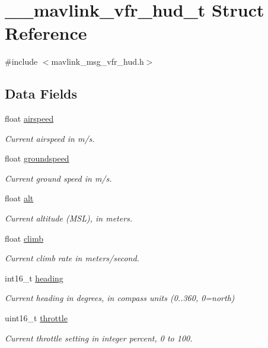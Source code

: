 \hypertarget{struct____mavlink__vfr__hud__t}{\section{\+\_\+\+\_\+mavlink\+\_\+vfr\+\_\+hud\+\_\+t Struct Reference}
\label{struct____mavlink__vfr__hud__t}
}


{\ttfamily \#include $<$mavlink\+\_\+msg\+\_\+vfr\+\_\+hud.\+h$>$}

\subsection*{Data Fields}
\begin{DoxyCompactItemize}
\item 
float \hyperlink{struct____mavlink__vfr__hud__t_a78714d39e0dd6db7448c6633442a9e00}{airspeed}
\begin{DoxyCompactList}\small\item\em Current airspeed in m/s. \end{DoxyCompactList}\item 
float \hyperlink{struct____mavlink__vfr__hud__t_aecadd708f2c0aee3193f00bd22711730}{groundspeed}
\begin{DoxyCompactList}\small\item\em Current ground speed in m/s. \end{DoxyCompactList}\item 
float \hyperlink{struct____mavlink__vfr__hud__t_a7a6c968281e1518a001e32e24424a8da}{alt}
\begin{DoxyCompactList}\small\item\em Current altitude (M\+S\+L), in meters. \end{DoxyCompactList}\item 
float \hyperlink{struct____mavlink__vfr__hud__t_a3b87f500e3394aef4c26d05435f1e7ba}{climb}
\begin{DoxyCompactList}\small\item\em Current climb rate in meters/second. \end{DoxyCompactList}\item 
int16\+\_\+t \hyperlink{struct____mavlink__vfr__hud__t_a54e333ab2f24a5340e8bd5cbfa91db15}{heading}
\begin{DoxyCompactList}\small\item\em Current heading in degrees, in compass units (0..360, 0=north) \end{DoxyCompactList}\item 
uint16\+\_\+t \hyperlink{struct____mavlink__vfr__hud__t_ae73bae71b52e32eb61edb4fbccac319c}{throttle}
\begin{DoxyCompactList}\small\item\em Current throttle setting in integer percent, 0 to 100. \end{DoxyCompactList}\end{DoxyCompactItemize}


